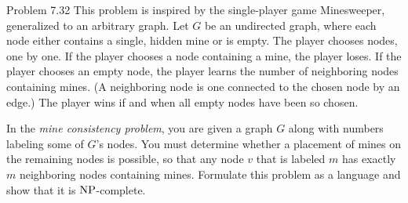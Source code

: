 \begin{question}{Problem 7.32}
This problem is inspired by the single-player game Minesweeper, generalized to an arbitrary graph. Let $G$ be an undirected graph, where each node either contains a single, hidden mine or is empty. The player chooses nodes, one by one. If the player chooses a node containing a mine, the player loses. If the player chooses an empty node, the player learns the number of neighboring nodes containing mines. (A neighboring node is one connected to the chosen node by an edge.) The player wins if and when all empty nodes have been so chosen.

In the \emph{mine consistency problem}, you are given a graph $G$ along with numbers labeling some of $G$'s nodes. You must determine whether a placement of mines on the remaining nodes is possible, so that any node $v$ that is labeled $m$ has exactly $m$ neighboring nodes containing mines. Formulate this problem as a language and show that it is $\mathrm{NP}$-complete.
\end{question}
